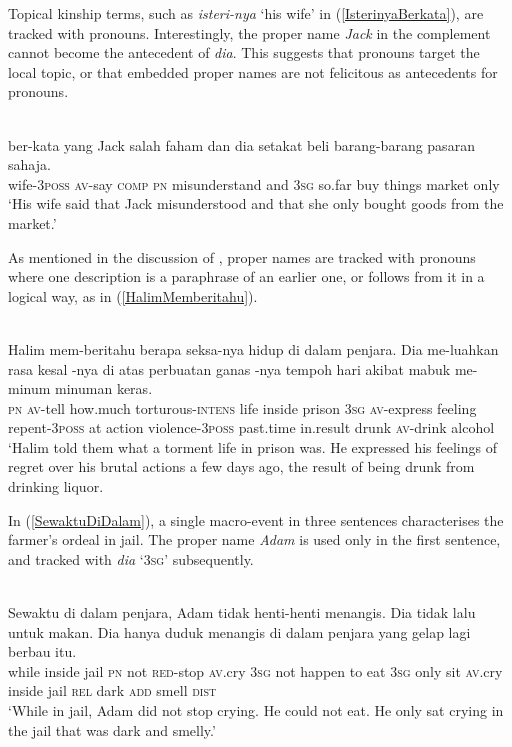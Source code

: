 \documentclass[output=paper
,modfonts
,nonflat]{langsci/langscibook}
\begin{document}
\noindent
Topical kinship terms, such as \emph{isteri-nya} `his wife' in (\ref{IsterinyaBerkata}), are tracked with pronouns. Interestingly, the proper name \emph{Jack} in the complement  cannot become the antecedent of \emph{dia}. This suggests that   pronouns target the local topic, or that embedded proper names are not felicitous as antecedents for pronouns.

\ea\label{IsterinyaBerkata} 
\\
\gll {}     ber-kata yang Jack        {salah faham}   dan   {\ob}dia{\cb} setakat beli barang-barang pasaran sahaja.\\
wife-\textsc{3poss} \textsc{av-}say     \textsc{comp} \textsc{pn} misunderstand and  \textsc{3sg} so.far  buy  things        market  only\\
\glt `His wife said that Jack misunderstood and that she only bought goods from 
the market.'
\z

\noindent
As mentioned in the discussion of , proper names are tracked with pronouns where one description is a paraphrase of an earlier one, or follows from it in a logical way, as in (\ref{HalimMemberitahu}).

\ea\label{HalimMemberitahu} 
\\
\gll  {\ob}Halim{\cb}       mem-beritahu berapa   seksa-nya       hidup {di dalam} penjara.  {\ob}Dia{\cb} me-luahkan rasa    kesal {\ob}-nya{\cb}       {di atas} perbuatan ganas {\ob}-nya{\cb}        {tempoh hari} akibat  mabuk me-minum {minuman keras}.\\
\textsc{pn} \textsc{av-}tell        how.much torturous-\textsc{intens} life  inside   prison  \textsc{3sg} \textsc{av-}express   feeling repent-\textsc{3poss}      at   action    violence-\textsc{3poss} past.time   in.result drunk
\textsc{av-}drink   alcohol\\
\glt `Halim told them what a torment life in prison was. He expressed his feelings of regret over his brutal actions a few days ago, the result of being drunk from drinking liquor.\\
\z

\noindent
In (\ref{SewaktuDiDalam}), a single macro-event in three sentences characterises the farmer's ordeal in jail. The proper name \emph{Adam} is used only in the first sentence, and tracked with  \emph{dia} `\textsc{3sg}' subsequently.

\ea\label{SewaktuDiDalam} 
\\
\gll  Sewaktu     {di dalam} penjara, {\ob}Adam{\cb} tidak henti-henti    menangis.  {\ob}Dia{\cb} tidak lalu untuk makan.  {\ob}Dia{\cb} hanya duduk menangis {di dalam} penjara yang gelap lagi  berbau itu.\\
while  inside   jail   \textsc{pn} not   \textsc{red}-stop  \textsc{av.}cry \textsc{3sg} not   happen to   eat \textsc{3sg} only  sit  \textsc{av.}cry      inside   jail  \textsc{rel}  dark  \textsc{add}  smell  \textsc{dist}\\
\glt `While in jail, Adam did not stop crying. He could not eat. He only sat crying in the jail that was dark and smelly.'
\z
\end{document}
